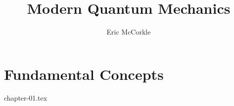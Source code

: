 \documentclass{report}
\title{Modern Quantum Mechanics}
\author{Eric McCorkle}
\begin{document}
\maketitle
\tableofcontents

\chapter{Fundamental Concepts}
{chapter-01.tex}
\end{document}
